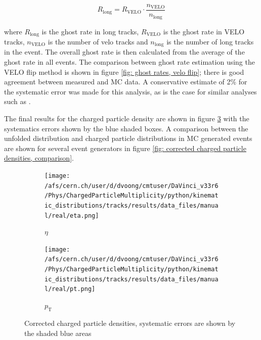 \begin{equation}
	R_\mathrm{long} = R_\mathrm{VELO} \cdot \frac{n_\mathrm{VELO}}{n_\mathrm{long}}
\end{equation}

where $R_\mathrm{long}$ is the ghost rate in long tracks, $R_\mathrm{VELO}$ is the ghost rate in VELO tracks, $n_\mathrm{VELO}$ is the number of velo tracks and $n_\mathrm{long}$ is the number of long tracks in the event. The overall ghost rate is then calculated from the average of the ghost rate in all events. The comparison between ghost rate estimation using the VELO flip method is shown in figure \ref{fig: ghost rates, velo flip}; there is good agreement between measured and MC data. A conservative estimate of 2\% for the systematic error was made for this analysis, as is the case for similar analyses such as \cite{Aaij:1662427}.

The final results for the charged particle density are shown in figure \ref{fig: corrected charged particle densities} with the systematics errors shown by the blue shaded boxes. A comparison between the unfolded distribution and charged particle distributions in MC generated events are shown for several event generators in figure \ref{fig: corrected charged particle densities, comparison}. 

\begin{figure}[h]
	\centering
	\begin{subfigure}{0.49\textwidth}
		\texttt{[image: /afs/cern.ch/user/d/dvoong/cmtuser/DaVinci\_v33r6/Phys/ChargedParticleMultiplicity/python/kinematic\_distributions/tracks/results/data\_files/manual/real/eta.png]}
		\caption{$\eta$}
		\label{fig: charged particle density, eta result}
	\end{subfigure}
	\begin{subfigure}{0.49\textwidth}
		\texttt{[image: /afs/cern.ch/user/d/dvoong/cmtuser/DaVinci\_v33r6/Phys/ChargedParticleMultiplicity/python/kinematic\_distributions/tracks/results/data\_files/manual/real/pt.png]}
		\caption{$p_\mathrm{T}$}
		\label{fig: charged particle density, pt result}
	\end{subfigure}
	\caption{Corrected charged particle densities, systematic errors are shown by the shaded blue areas}
	\label{fig: corrected charged particle densities}
\end{figure}

